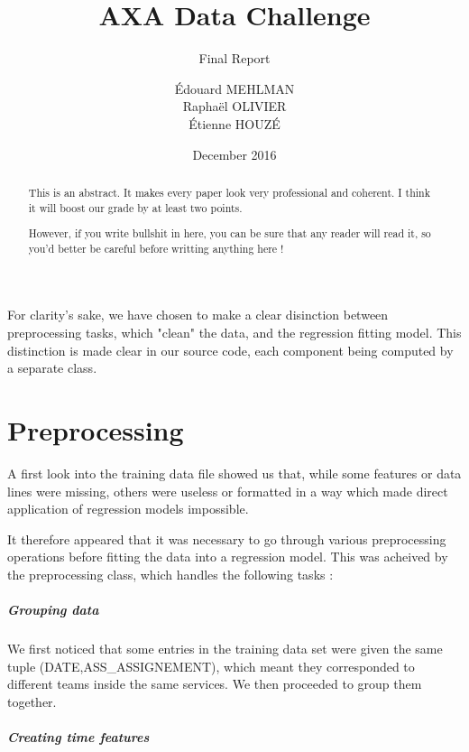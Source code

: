 \documentclass[a4paper,10pt]{article}
\title{AXA Data Challenge}
\subtitle{Final Report}
\author{Édouard MEHLMAN\\
        Raphaël OLIVIER\\
        Étienne HOUZÉ}
\date{December 2016}
\begin{document}
  \maketitle

\begin{abstract}
  This is an abstract. It makes every paper look very professional and coherent. I think it will boost our grade by at least two points.

  However, if you write bullshit in here, you can be sure that any reader will read it, so you'd better be careful before writting anything here !
\end{abstract}

For clarity's sake, we have chosen to make a clear disinction between preprocessing tasks, which "clean" the data, and the regression fitting model. This distinction is made clear in our source code, each component being computed by a separate class.

\part{Preprocessing}

  A first look into the training data file showed us that, while some features or data lines were missing, others were useless or formatted in a way which made direct application of regression models impossible.

  It therefore appeared that it was necessary to go through various preprocessing operations before fitting the data into a regression model. This was acheived by the preprocessing class, which handles the following tasks :

    \subsubsection{Grouping data}

    We first noticed that some entries in the training data set were given the same tuple (DATE,ASS\_ASSIGNEMENT), which meant they corresponded to different teams inside the same services. We then proceeded to group them together.

    \subsubsection{Creating time features}
\end{document}
